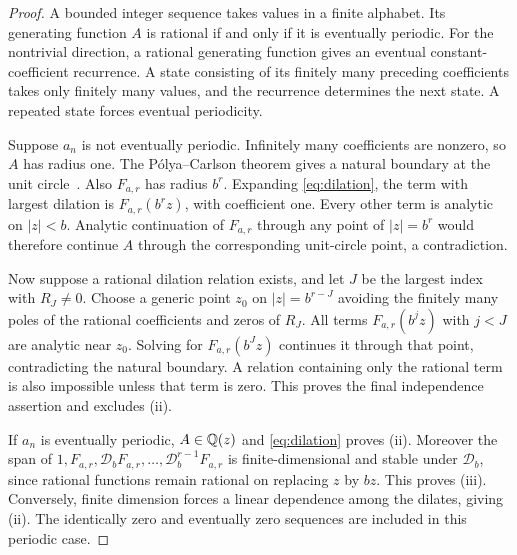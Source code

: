\documentclass[11pt,a4paper]{article}
\theoremstyle{definition}\newtheorem{definition}[theorem]{Definition}
\theoremstyle{remark}\newtheorem*{remark}{Remark}
\begin{document}
\begin{proof}
A bounded integer sequence takes values in a finite alphabet. Its generating
function $A$ is rational if and only if it is eventually periodic. For the
nontrivial direction, a rational generating function gives an eventual
constant-coefficient recurrence. A state consisting of its finitely many
preceding coefficients takes only finitely many values, and the recurrence
determines the next state. A repeated state forces eventual periodicity.

Suppose $a_n$ is not eventually periodic. Infinitely many coefficients are
nonzero, so $A$ has radius one. The P\'olya--Carlson theorem gives a natural
boundary at the unit circle~\cite{bell-miles-ward}. Also $F_{a,r}$ has radius
$b^r$. Expanding \eqref{eq:dilation}, the term with largest dilation is
$F_{a,r}(b^rz)$, with coefficient one. Every other term is analytic on
$|z|<b$. Analytic continuation of $F_{a,r}$ through any point of $|z|=b^r$
would therefore continue $A$ through the corresponding unit-circle point,
a contradiction.

Now suppose a rational dilation relation exists, and let $J$ be the largest
index with $R_J\ne0$. Choose a generic point $z_0$ on
$|z|=b^{r-J}$ avoiding the finitely many poles of the rational coefficients
and zeros of $R_J$. All terms $F_{a,r}(b^jz)$ with $j<J$ are analytic near
$z_0$. Solving for $F_{a,r}(b^Jz)$ continues it through that point, contradicting
the natural boundary. A relation containing only the rational term is also
impossible unless that term is zero. This proves the final independence
assertion and excludes (ii).

If $a_n$ is eventually periodic, $A\in\mathbb Q(z)$ and \eqref{eq:dilation}
proves (ii). Moreover the span of
$1,F_{a,r},\mathcal D_bF_{a,r},\ldots,\mathcal D_b^{r-1}F_{a,r}$ is
finite-dimensional and stable under $\mathcal D_b$, since rational functions
remain rational on replacing $z$ by $bz$. This proves (iii). Conversely,
finite dimension forces a linear dependence among the dilates, giving (ii).
The identically zero and eventually zero sequences are included in this
periodic case.
\end{proof}
\end{document}
